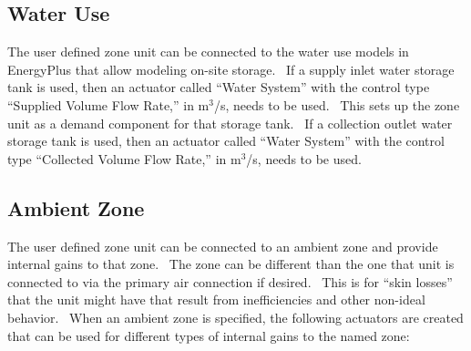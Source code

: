 \subsection{Water Use}\label{water-use-002}

The user defined zone unit can be connected to the water use models in EnergyPlus that allow modeling on-site storage.~ If a supply inlet water storage tank is used, then an actuator called ``Water System'' with the control type ``Supplied Volume Flow Rate,'' in m\(^{3}\)/s, needs to be used.~ This sets up the zone unit as a demand component for that storage tank.~ If a collection outlet water storage tank is used, then an actuator called ``Water System'' with the control type ``Collected Volume Flow Rate,'' in m\(^{3}\)/s, needs to be used.

\subsection{Ambient Zone}\label{ambient-zone-002}

The user defined zone unit can be connected to an ambient zone and provide internal gains to that zone.~ The zone can be different than the one that unit is connected to via the primary air connection if desired.~ This is for ``skin losses'' that the unit might have that result from inefficiencies and other non-ideal behavior.~ When an ambient zone is specified, the following actuators are created that can be used for different types of internal gains to the named zone:

